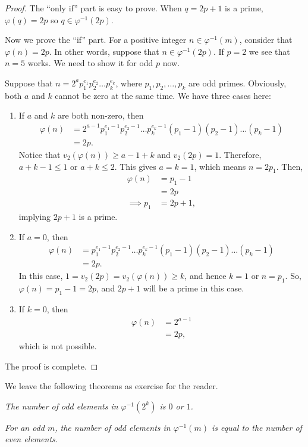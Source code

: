 \documentclass[main.tex]{subfile}
\begin{document}
		\begin{proof}
			The ``only if'' part is easy to prove. When $q=2p+1$ is a prime, $\varphi(q)=2p$ so $q\in\varphi^{-1}(2p)$.

			Now we prove the ``if'' part. For a positive integer $n\in\varphi^{-1}(m)$, consider that $\varphi(n)=2p$. In other words, suppose that $n \in\varphi^{-1}(2p)$.  If $p=2$ we see that $n=5$ works. We need to show it for odd $p$ now.

			Suppose that $n= 2^a p_1^{e_1}p_2^{e_2}\dots p_k^{e_k}$, where $p_1, p_2, \dots, p_k$ are odd primes. Obviously, both $a$ and $k$ cannot be zero at the same time. We have three cases here:

				\begin{enumerate}
					\item If $a$ and $k$ are both non-zero, then
						\begin{align*}
							\varphi(n) &= 2^{a-1} p_1^{e_1-1}p_2^{e_2-1}\dots p_k^{e_k-1} (p_1-1)(p_2-1)\dots (p_k-1)\\
									   &= 2p.
						\end{align*}
					Notice that $v_2(\varphi(n)) \geq a-1+k$ and $v_2(2p)=1$. Therefore, $a+k-1 \leq 1$ or $a+k \leq 2$. This gives $a=k=1$, which means $n=2p_1$. Then,
						\begin{align*}
							\varphi(n)   &= p_1-1\\
									     &= 2p\\
							\implies p_1 &= 2p+1,
						\end{align*}
					implying $2p+1$ is a prime.

					\item If $a=0$, then
						\begin{align*}
							\varphi(n) &= p_1^{e_1-1}p_2^{e_2-1}\dots p_k^{e_k-1} (p_1-1)(p_2-1)\dots (p_k-1)\\
									   &= 2p.
						\end{align*}
					In this case, $1 = v_2(2p) = v_2(\varphi(n)) \geq k$, and hence $k=1$ or $n=p_1$. So, $\varphi(n)=p_1-1=2p$, and $2p+1$ will be a prime in this case.

					\item If $k=0$, then
						\begin{align*}
							\varphi(n) &= 2^{a-1}\\
									   &= 2p,
						\end{align*}
					which is not possible.
				\end{enumerate}
			The proof is complete.
		\end{proof}

	We leave the following theorems as exercise for the reader.
		\begin{theorem}\slshape
			The number of odd elements in $\varphi^{-1}(2^k)$ is $0$ or $1$.
		\end{theorem}

		\begin{theorem}\slshape
			For an odd $m$, the number of odd elements in $\varphi^{-1}(m)$ is equal to the number of even elements.
		\end{theorem}
\end{document}
